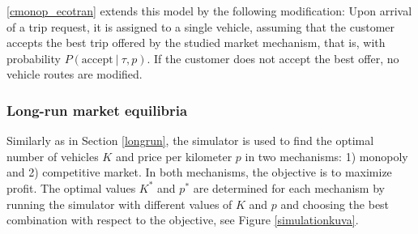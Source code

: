 \documentclass[dissertation,draft*]{aaltoseries}
\begin{document}
\ref{cmonop_ecotran} extends this model by the following modification:
Upon arrival of a trip request, it is assigned to a single vehicle, assuming that the customer accepts the 
best trip offered by the studied market mechanism, that is, with probability $P(\mbox{accept} \ | \ \tau, p)$.
If the customer does not accept the best offer, no vehicle routes are modified.

\subsubsection{Long-run market equilibria}
Similarly as in Section \ref{longrun}, the simulator is used to find the optimal number of 
vehicles $K$ and price per kilometer $p$ in two mechanisms: 
1) monopoly and 2) competitive market.
In both mechanisms, the objective is to maximize profit. The optimal values $K^*$ and $p^*$
are determined for each mechanism by running the simulator with different values of $K$ and $p$ and choosing the
best combination with respect to the objective, see Figure \ref{simulationkuva}. 
\end{document}
